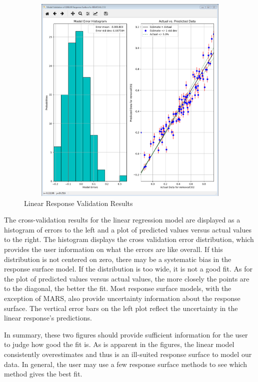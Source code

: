 \begin{figure}[H]
\centering \includegraphics[width=6.5in,height=4in,keepaspectratio]{Chapt_uq/figs/tutorial/23_RSValidationLinear}
\caption{Linear Response Validation Results}
\label{fig:uqt_rs_validate_results}
\end{figure}

The cross-validation results for the linear regression model are displayed as a histogram of errors to the left and a plot of predicted values versus actual values to the right. The histogram displays the cross validation error distribution, which provides the user information on what the errors are like overall. If this distribution is not centered on zero, there may be a systematic bias in the response surface model. If the distribution is too wide, it is not a good fit. As for the plot of predicted values versus actual values, the more closely the points are to the diagonal, the better the fit. Most response surface models, with the exception of MARS, also provide
uncertainty information about the response surface. The vertical error bars on the left plot reflect the uncertainty in the linear response's predictions.

In summary, these two figures should provide sufficient information for the user to judge how good the fit is. As is apparent in the figures, the linear model consistently overestimates and thus is an ill-suited response surface to model our data. In general, the user may use a few response surface methods to see which method gives the best fit.

